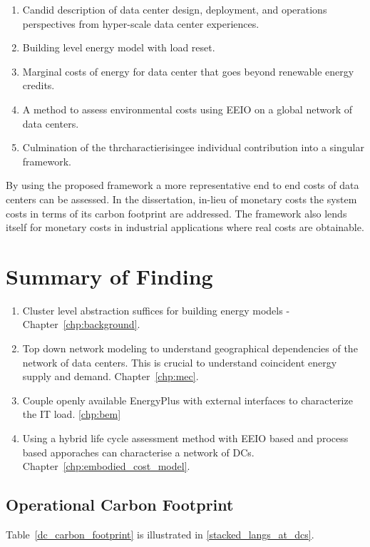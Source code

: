 \begin{enumerate}
    \item Candid description of data center design, deployment, and operations perspectives from hyper-scale data center experiences. 
    \item Building level energy model with load reset.
    \item Marginal costs of energy for data center that goes beyond renewable energy credits.
    \item A method to assess environmental costs using EEIO on a global network of data centers.
    \item Culmination of the thrcharactierisingee individual contribution into a singular framework.
\end{enumerate} 

By using the proposed framework a more representative end to end costs of data centers can be assessed. In the dissertation, in-lieu of monetary costs the system costs in terms of its carbon footprint are addressed. The framework also lends itself for monetary costs in industrial applications where real costs are obtainable.

\section{Summary of Finding}
\begin{enumerate}
    \item Cluster level abstraction suffices for building energy models - Chapter~\ref{chp:background}.
    \item Top down network modeling to understand geographical dependencies of the network of data centers. This is crucial to understand coincident energy supply and demand. Chapter~\ref{chp:mec}.
    \item Couple openly available EnergyPlus with external interfaces to characterize the IT load. \ref{chp:bem}
    \item Using a hybrid life cycle assessment method with EEIO based and process based apporaches can characterise a network of DCs. Chapter~\ref{chp:embodied_cost_model}.
\end{enumerate}


\subsection{Operational Carbon Footprint}
Table~\ref{dc_carbon_footprint} is illustrated in \ref{stacked_langs_at_dcs}.


